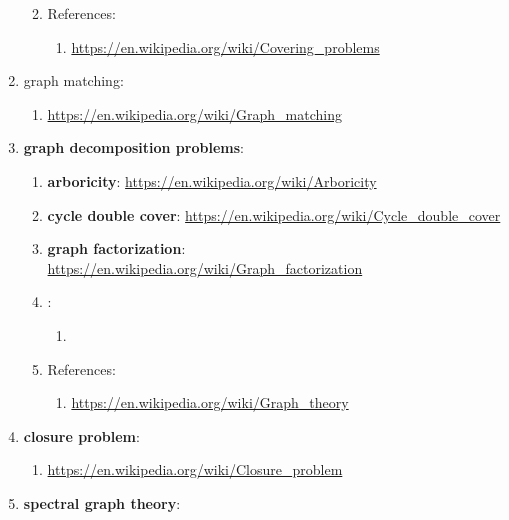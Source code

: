 \begin{enumerate}
\begin{enumerate}
\begin{enumerate}
		\end{enumerate}
	\item References: \vspace{-0.2cm}
		\begin{enumerate} \itemsep -2pt
		\item \url{https://en.wikipedia.org/wiki/Covering_problems}
		\end{enumerate}
	\end{enumerate}
\item graph matching: \vspace{-0.3cm}
	\begin{enumerate} \itemsep -2pt
	\item \url{https://en.wikipedia.org/wiki/Graph_matching}
	\end{enumerate}
\item {\bf graph decomposition problems}: \vspace{-0.3cm}
	\begin{enumerate} \itemsep -2pt
	\item {\bf arboricity}: \url{https://en.wikipedia.org/wiki/Arboricity}
	\item {\bf cycle double cover}: \url{https://en.wikipedia.org/wiki/Cycle_double_cover}
	\item {\bf graph factorization}: \url{https://en.wikipedia.org/wiki/Graph_factorization}
	\item : \vspace{-0.2cm}
		\begin{enumerate} \itemsep -2pt
		\item 
		\end{enumerate}
	\item References: \vspace{-0.2cm}
		\begin{enumerate} \itemsep -2pt
		\item \url{https://en.wikipedia.org/wiki/Graph_theory}
		\end{enumerate}
	\end{enumerate}
\item {\bf closure problem}: \vspace{-0.3cm}
	\begin{enumerate} \itemsep -2pt
	\item \url{https://en.wikipedia.org/wiki/Closure_problem}
	\end{enumerate}
\item {\bf spectral graph theory}: \vspace{-0.3cm}
	\begin{enumerate} \itemsep -2pt

\end{enumerate}
\end{enumerate}
